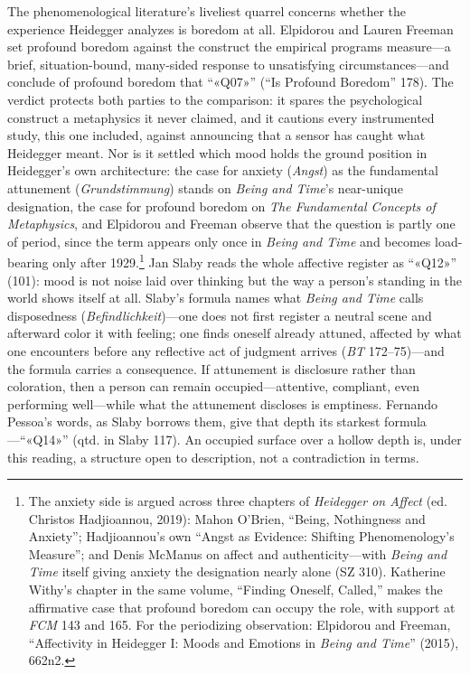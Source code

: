 The phenomenological literature's liveliest quarrel concerns whether the experience Heidegger
analyzes is boredom at all. Elpidorou and Lauren Freeman set profound boredom against the
construct the empirical programs measure---a brief, situation-bound, many-sided response to
unsatisfying circumstances---and conclude of profound boredom that ``«Q07»'' (``Is Profound Boredom'' 178). The
verdict protects both parties to the comparison: it spares the psychological construct a
metaphysics it never claimed, and it cautions every instrumented study, this one included,
against announcing that a sensor has caught what Heidegger meant. Nor is it settled which
mood holds the ground position in Heidegger's own architecture: the case for anxiety
(\textit{Angst}) as the fundamental attunement (\textit{Grundstimmung}) stands on
\textit{Being and Time}'s near-unique designation, the case for profound boredom on
\textit{The Fundamental Concepts of Metaphysics}, and Elpidorou and Freeman observe that the
question is partly one of period, since the term appears only once in \textit{Being and Time}
and becomes load-bearing only after 1929.\footnote{The anxiety side is argued across three
chapters of \textit{Heidegger on Affect} (ed. Christos Hadjioannou, 2019): Mahon O'Brien,
``Being, Nothingness and Anxiety''; Hadjioannou's own ``Angst as Evidence: Shifting
Phenomenology's Measure''; and Denis McManus on affect and authenticity---with \textit{Being and Time}
itself giving anxiety the designation nearly alone (SZ 310). Katherine Withy's chapter in the
same volume, ``Finding Oneself, Called,'' makes the affirmative case that profound boredom
can occupy the role, with support at \textit{FCM} 143 and 165. For the periodizing
observation: Elpidorou and Freeman, ``Affectivity in Heidegger I: Moods and Emotions in
\textit{Being and Time}'' (2015), 662n2.} Jan Slaby reads the whole affective register as
``«Q12»'' (101): mood is not noise laid over thinking but the way a person's standing in the
world shows itself at all. Slaby's formula names what \textit{Being and Time} calls
disposedness (\textit{Befindlichkeit})---one does not first register a neutral scene and
afterward color it with feeling; one finds oneself already attuned, affected by what one
encounters before any reflective act of judgment arrives (\textit{BT} 172--75)---and the
formula carries a consequence. If attunement is disclosure rather than coloration, then a
person can remain occupied---attentive, compliant, even performing well---while what the
attunement discloses is emptiness. Fernando Pessoa's words, as Slaby borrows them, give that
depth its starkest formula---``«Q14»'' (qtd. in Slaby 117). An occupied surface over a hollow
depth is, under this reading, a structure open to description, not a contradiction in terms.

